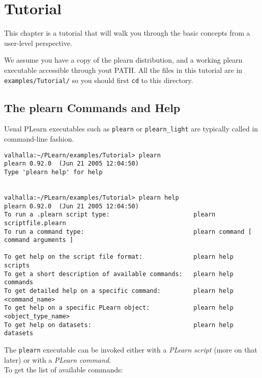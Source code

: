 \documentclass[11pt]{book}
\begin{document}
\chapter{Tutorial}

This chapter is a tutorial that will walk you through the basic concepts from a user-level perspective.

We assume you have a copy of the plearn distribution, and a working plearn
executable accessible through yout PATH. All the files in this tutorial are in \verb!examples/Tutorial/!
so you should first {\tt cd} to this directory.

\section{The plearn Commands and Help}

Usual PLearn executables such as \verb!plearn! or \verb!plearn_light! are
typically called in command-line fashion.

\begin{verbatim}
valhalla:~/PLearn/examples/Tutorial> plearn
plearn 0.92.0  (Jun 21 2005 12:04:50)
Type 'plearn help' for help


valhalla:~/PLearn/examples/Tutorial> plearn help
plearn 0.92.0  (Jun 21 2005 12:04:50)
To run a .plearn script type:                       plearn scriptfile.plearn
To run a command type:                              plearn command [ command arguments ]

To get help on the script file format:              plearn help scripts
To get a short description of available commands:   plearn help commands
To get detailed help on a specific command:         plearn help <command_name>
To get help on a specific PLearn object:            plearn help <object_type_name>
To get help on datasets:                            plearn help datasets
\end{verbatim}

The {\tt plearn} executable can be invoked either with a {\em PLearn script} (more on that later) or with a {\em PLearn command}.\\
To get the list of available commands:
\end{document}
